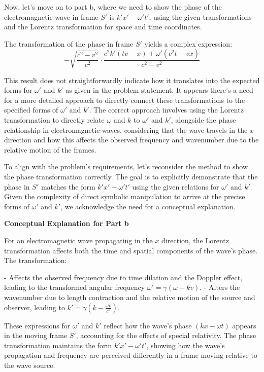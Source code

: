 Now, let's move on to part b, where we need to show the phase of the electromagnetic wave in frame \( S' \) is \( k'x' - \omega' t' \), using the given transformations and the Lorentz transformation for space and time coordinates.

The transformation of the phase in frame \( S' \) yields a complex expression:
\[
- \sqrt{\frac{c^2 - v^2}{c^2}} \cdot \frac{c^2 k' (t v - x) + \omega' (c^2 t - v x)}{c^2 - v^2}
\]

This result does not straightforwardly indicate how it translates into the expected forms for \( \omega' \) and \( k' \) as given in the problem statement. It appears there's a need for a more detailed approach to directly connect these transformations to the specified forms of \( \omega' \) and \( k' \). The correct approach involves using the Lorentz transformation to directly relate \( \omega \) and \( k \) to \( \omega' \) and \( k' \), alongside the phase relationship in electromagnetic waves, considering that the wave travels in the \( x \) direction and how this affects the observed frequency and wavenumber due to the relative motion of the frames.

To align with the problem's requirements, let's reconsider the method to show the phase transformation correctly. The goal is to explicitly demonstrate that the phase in \( S' \) matches the form \( k'x' - \omega' t' \) using the given relations for \( \omega' \) and \( k' \). Given the complexity of direct symbolic manipulation to arrive at the precise forms of \( \omega' \) and \( k' \), we acknowledge the need for a conceptual explanation.

\textbf{Conceptual Explanation for Part b}

For an electromagnetic wave propagating in the \( x \) direction, the Lorentz transformation affects both the time and spatial components of the wave's phase. The transformation:

- Affects the observed frequency due to time dilation and the Doppler effect, leading to the transformed angular frequency \( \omega' = \gamma(\omega - kv) \).
- Alters the wavenumber due to length contraction and the relative motion of the source and observer, leading to \( k' = \gamma(k - \frac{\omega v}{c^2}) \).

These expressions for \( \omega' \) and \( k' \) reflect how the wave's phase \( (kx - \omega t) \) appears in the moving frame \( S' \), accounting for the effects of special relativity. The phase transformation maintains the form \( k'x' - \omega' t' \), showing how the wave's propagation and frequency are perceived differently in a frame moving relative to the wave source.

